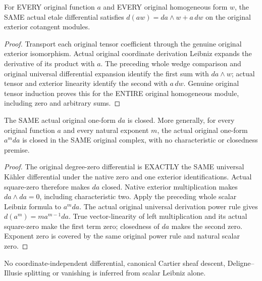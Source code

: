 \begin{theorem}
\label{lem:cartier-etale-intrinsic-scalar-leibniz}
\leanok
For EVERY original function $a$ and EVERY original homogeneous form $w$,
the SAME actual etale differential satisfies
$d(aw)=da\wedge w+a\,dw$ on the original exterior cotangent modules.
\end{theorem}
\begin{proof}
Transport each original tensor coefficient through the genuine original
exterior isomorphism. Actual original coordinate derivation Leibniz expands
the derivative of its product with $a$. The preceding whole wedge comparison
and original universal differential expansion identify the first sum with
$da\wedge w$; actual tensor and exterior linearity identify the second with
$a\,dw$. Genuine original tensor induction proves this for the ENTIRE
original homogeneous module, including zero and arbitrary sums.
\end{proof}

\begin{theorem}
\label{lem:cartier-etale-intrinsic-closed-generators}
\leanok
The SAME actual original one-form $da$ is closed. More generally, for every
original function $a$ and every natural exponent $m$, the actual original
one-form $a^m da$ is closed in the SAME original complex, with no
characteristic or closedness premise.
\end{theorem}
\begin{proof}
The original degree-zero differential is EXACTLY the SAME universal
K\"ahler differential under the native zero and one exterior identifications.
Actual square-zero therefore makes $da$ closed. Native exterior multiplication
makes $da\wedge da=0$, including characteristic two. Apply the preceding
whole scalar Leibniz formula to $a^m da$. The actual original universal
derivation power rule gives $d(a^m)=m a^{m-1} da$. True vector-linearity of
left multiplication and its actual square-zero make the first term zero;
closedness of $da$ makes the second zero. Exponent zero is covered by the
same original power rule and natural scalar zero.
\end{proof}

No coordinate-independent differential, canonical Cartier sheaf descent,
Deligne--Illusie splitting or vanishing is inferred from scalar Leibniz alone.
